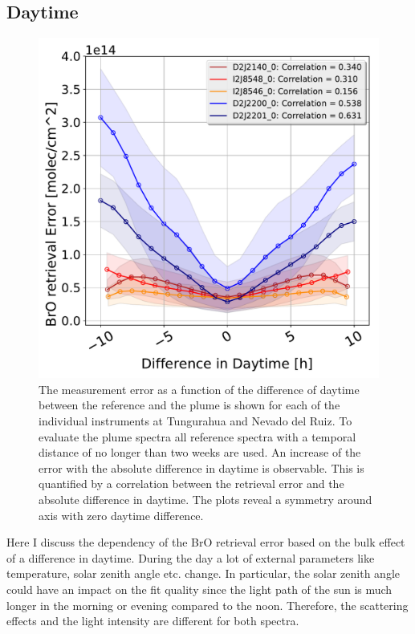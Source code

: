 \subsection{ Daytime \label{chap:daytime}}
\begin{figure}
	\centering
	\includegraphics[width=0.7\linewidth]{Bilder/DiffDaytimeallInstruments}
	\caption{The  measurement error as a function of the difference of daytime between the reference and the plume is shown for each of the individual instruments at Tungurahua and Nevado del Ruiz. To evaluate the plume spectra all reference spectra with a temporal distance of no longer than two weeks are used. An increase of the  error with the absolute difference in daytime is observable. This is quantified by a correlation between the  retrieval error and the absolute difference in daytime. The plots reveal a symmetry around axis with zero daytime difference. }
	\label{fig:diffdaytime}
\end{figure}
Here I discuss the dependency of the BrO retrieval error based on the bulk effect of a difference in daytime. During the day a lot of external parameters like temperature, solar zenith angle etc. change. In particular, the solar zenith angle could have an impact on the fit quality since the light path of the sun is much longer in the morning or evening compared to the noon. Therefore, the scattering effects and the light intensity are different for both spectra.\\

